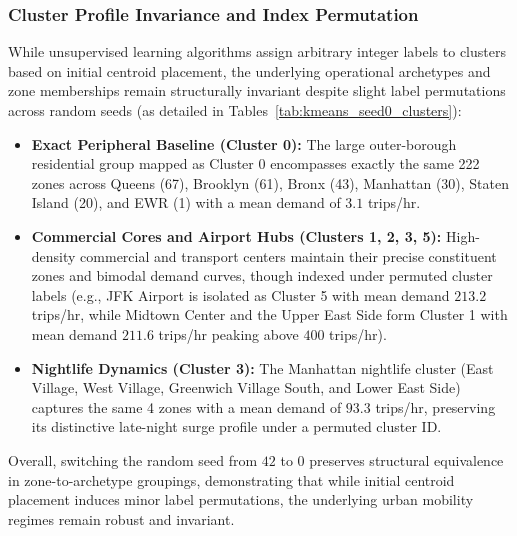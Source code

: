 \documentclass[11pt,a4paper]{article}
\begin{document}
\subsubsection{Cluster Profile Invariance and Index Permutation}
While unsupervised learning algorithms assign arbitrary integer labels to clusters based on initial centroid placement, the underlying operational archetypes and zone memberships remain structurally invariant despite slight label permutations across random seeds (as detailed in Tables~\ref{tab:kmeans_seed0_clusters}):
\begin{itemize}
    \item \textbf{Exact Peripheral Baseline (Cluster 0):} The large outer-borough residential group mapped as Cluster 0 encompasses exactly the same 222 zones across Queens (67), Brooklyn (61), Bronx (43), Manhattan (30), Staten Island (20), and EWR (1) with a mean demand of $3.1$ trips/hr.
    \item \textbf{Commercial Cores and Airport Hubs (Clusters 1, 2, 3, 5):} High-density commercial and transport centers maintain their precise constituent zones and bimodal demand curves, though indexed under permuted cluster labels (e.g., JFK Airport is isolated as Cluster 5 with mean demand $213.2$ trips/hr, while Midtown Center and the Upper East Side form Cluster 1 with mean demand $211.6$ trips/hr peaking above $400$ trips/hr).
    \item \textbf{Nightlife Dynamics (Cluster 3):} The Manhattan nightlife cluster (East Village, West Village, Greenwich Village South, and Lower East Side) captures the same 4 zones with a mean demand of $93.3$ trips/hr, preserving its distinctive late-night surge profile under a permuted cluster ID.
\end{itemize}

Overall, switching the random seed from $42$ to $0$ preserves structural equivalence in zone-to-archetype groupings, demonstrating that while initial centroid placement induces minor label permutations, the underlying urban mobility regimes remain robust and invariant.
\end{document}
